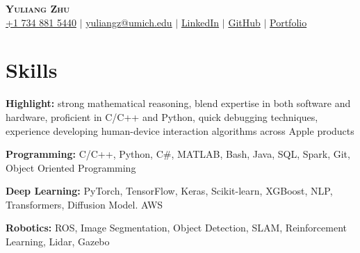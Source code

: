\documentclass[letterpaper,11pt]{article}
\newcommand{\resumeSubHeadingListStart}{\begin{itemize}[leftmargin=0.15in, label={}]}
\newcommand{\resumeSubHeadingListEnd}{\end{itemize}}
\begin{document}

\begin{center}
    \textbf{\Huge \scshape Yuliang Zhu} \\ \vspace{1pt}
    \small
    \faMobile \hspace{.5pt} \href{tel:1734885440}{+1 734 881 5440}
    $|$
    \faAt \hspace{.5pt} \href{mailto:yuliangz@umich.edu}{yuliangz@umich.edu}
    $|$
    \faLinkedinSquare \hspace{.5pt} \href{https://www.linkedin.com/in/yuliang-zhu-34005315b}{LinkedIn}
    $|$
    \faGithub \hspace{.5pt} \href{https://github.com/angrypiggy}{GitHub}
    $|$
    \faGlobe \hspace{.5pt} \href{https://angrypiggy.github.io/yuliangz/}{Portfolio}
\end{center}


\vspace*{-15pt}
\section{Skills}
  \vspace{1pt}
  \resumeSubHeadingListStart
    \small{\item{
        \textbf{Highlight:}{ strong mathematical reasoning, blend expertise in both software and hardware, proficient in C/C++ and Python, quick debugging techniques, experience developing human-device interaction algorithms across Apple products} \\ \vspace{3pt}

        \textbf{Programming:}{ C/C++, Python, C\#, MATLAB, Bash, Java, SQL, Spark, Git, Object Oriented Programming} \\ \vspace{3pt}
        
        \textbf{Deep Learning:}{ PyTorch, TensorFlow, Keras, Scikit-learn, XGBoost, NLP, Transformers, Diffusion Model. AWS} \\ \vspace{3pt}
        
        \textbf{Robotics:}{ ROS, Image Segmentation, Object Detection, SLAM, Reinforcement Learning, Lidar, Gazebo} \\ \vspace{3pt}

        
        
    }}
  \resumeSubHeadingListEnd
\end{document}

